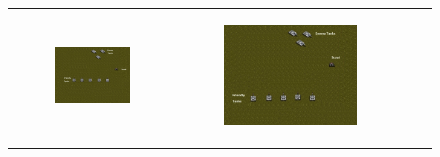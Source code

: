 \documentclass[11pt,letterpaper]{article}
\begin{document}
\begin{figure}
{\begin{tabular}{cccc}
\begin{subfigure}[b]{0.18\textwidth}\includegraphics[width=\textwidth]{figures/tanks-close.jpg}\caption{}\label{fig:tanks-a}\end{subfigure}&
\begin{subfigure}[b]{0.18\textwidth}\includegraphics[width=\textwidth]{figures/tanks-far.jpg}\caption{}\label{fig:tanks-b}\end{subfigure}&

\end{tabular}}
\end{figure}
\end{document}
